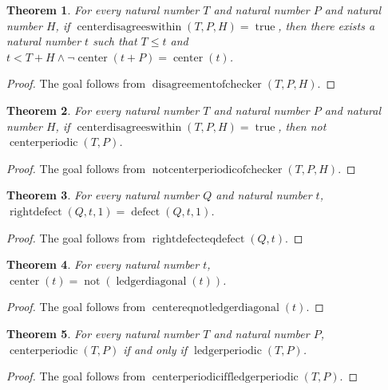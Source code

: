 \documentclass[11pt]{article}
\newtheorem{theorem}{Theorem}[section]
\theoremstyle{definition}
\begin{document}
\begin{theorem}
\label{ll:observations:disagreement-of-checker}
For every natural number \(T\) and natural number \(P\) and natural number \(H\), if \(\operatorname{centerdisagreeswithin}(T, P, H) = \operatorname{true}\), then there exists a natural number \(t\) such that \(T \le t\) and \(t < T + H \land \lnot\operatorname{center}(t + P) = \operatorname{center}(t)\).
\end{theorem}
\begin{proof}
The goal follows from \(\operatorname{disagreementofchecker}(T, P, H)\).
\end{proof}
\begin{theorem}
\label{ll:observations:not-center-periodic-of-checker}
For every natural number \(T\) and natural number \(P\) and natural number \(H\), if \(\operatorname{centerdisagreeswithin}(T, P, H) = \operatorname{true}\), then not \(\operatorname{centerperiodic}(T, P)\).
\end{theorem}
\begin{proof}
The goal follows from \(\operatorname{notcenterperiodicofchecker}(T, P, H)\).
\end{proof}
\begin{theorem}
\label{ll:observations:right-defect-eq-defect}
For every natural number \(Q\) and natural number \(t\), \(\operatorname{rightdefect}(Q, t, 1) = \operatorname{defect}(Q, t, 1)\).
\end{theorem}
\begin{proof}
The goal follows from \(\operatorname{rightdefecteqdefect}(Q, t)\).
\end{proof}
\begin{theorem}
\label{ll:observations:center-eq-not-ledger-diagonal}
For every natural number \(t\), \(\operatorname{center}(t) = \operatorname{not}(\operatorname{ledgerdiagonal}(t))\).
\end{theorem}
\begin{proof}
The goal follows from \(\operatorname{centereqnotledgerdiagonal}(t)\).
\end{proof}
\begin{theorem}
\label{ll:observations:center-periodic-iff-ledger-periodic}
For every natural number \(T\) and natural number \(P\), \(\operatorname{centerperiodic}(T, P)\) if and only if \(\operatorname{ledgerperiodic}(T, P)\).
\end{theorem}
\begin{proof}
The goal follows from \(\operatorname{centerperiodiciffledgerperiodic}(T, P)\).
\end{proof}
\end{document}
